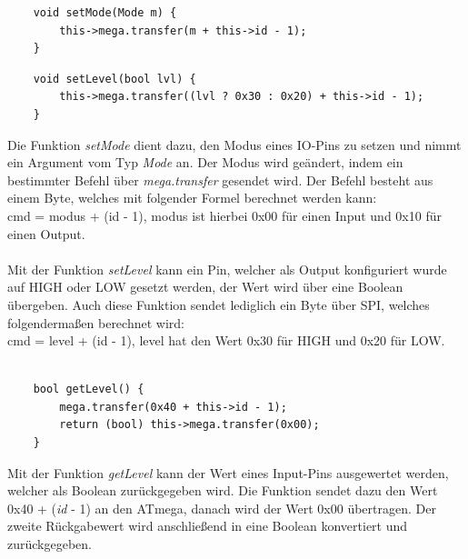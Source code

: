 \documentclass[12pt]{article}
\begin{document}
\begin{verbatim}
    void setMode(Mode m) {
        this->mega.transfer(m + this->id - 1);
    }
\end{verbatim}
\begin{verbatim}
    void setLevel(bool lvl) {
        this->mega.transfer((lvl ? 0x30 : 0x20) + this->id - 1);
    }
\end{verbatim}
\vspace{-2mm}
Die Funktion \textit{setMode} dient dazu, den Modus eines IO-Pins zu setzen und nimmt ein Argument vom Typ \textit{Mode} an. Der Modus wird geändert, indem ein bestimmter Befehl über \textit{mega.transfer} gesendet wird. Der Befehl besteht aus einem Byte, welches mit folgender Formel berechnet werden kann:\\cmd = modus + (id - 1), modus ist hierbei 0x00 für einen Input und 0x10 für einen Output.\\\\
Mit der Funktion \textit{setLevel} kann ein Pin, welcher als Output konfiguriert wurde auf HIGH oder LOW gesetzt werden, der Wert wird über eine Boolean übergeben. Auch diese Funktion sendet lediglich ein Byte über SPI, welches folgendermaßen berechnet wird:\\cmd = level + (id - 1), level hat den Wert 0x30 für HIGH und 0x20 für LOW.\\\\
\begin{verbatim}
    bool getLevel() {
        mega.transfer(0x40 + this->id - 1);
        return (bool) this->mega.transfer(0x00);
    }
\end{verbatim}
\vspace{-2mm}
Mit der Funktion \textit{getLevel} kann der Wert eines Input-Pins ausgewertet werden, welcher als Boolean zurückgegeben wird. Die Funktion sendet dazu den Wert 0x40 + (\textit{id} - 1) an den ATmega, danach wird der Wert 0x00 übertragen. Der zweite Rückgabewert wird anschließend in eine Boolean konvertiert und zurückgegeben.
\end{document}
